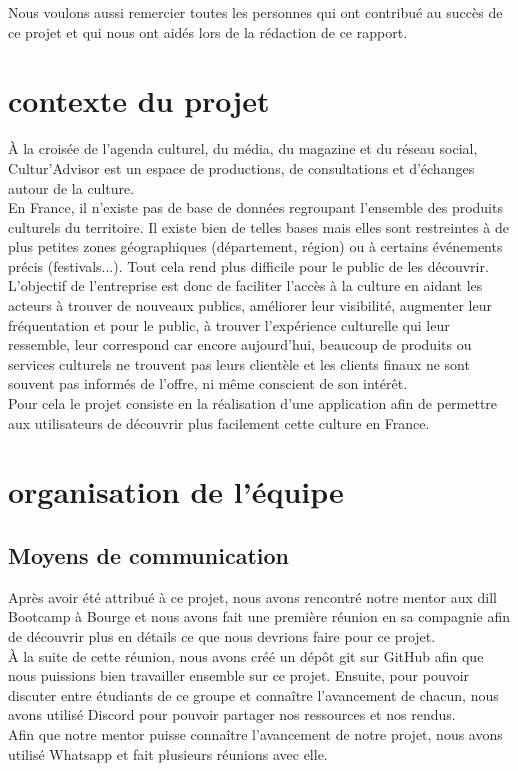 \documentclass{article}
\begin{document}
Nous voulons aussi remercier toutes les personnes qui ont contribué au succès de ce projet et qui nous ont aidés lors de la rédaction de ce rapport.


\newpage
\tableofcontents
\newpage %
\section{contexte du projet}
À la croisée de l’agenda culturel, du média, du magazine et du réseau social, Cultur’Advisor est un espace de productions, de consultations et d’échanges autour de la culture.\\
En France, il n’existe pas de base de données regroupant l’ensemble des produits culturels du territoire. Il existe bien de telles bases mais elles sont restreintes à de plus petites zones géographiques (département, région) ou à certains événements précis (festivals...). Tout cela rend plus difficile pour le public de les découvrir.\\
L’objectif de l’entreprise est donc de faciliter l’accès à la culture en aidant les acteurs à trouver de nouveaux publics, améliorer leur visibilité, augmenter leur fréquentation et pour le public, à trouver l’expérience culturelle qui leur ressemble, leur correspond car encore aujourd’hui, beaucoup de produits ou services culturels ne trouvent pas leurs clientèle et les clients finaux ne sont souvent pas informés de l’offre, ni même conscient de son intérêt.\\
Pour cela le projet consiste en la réalisation d’une application afin de permettre aux utilisateurs de découvrir plus facilement cette culture en France.
\newpage

\section{organisation de l'équipe}

\subsection{Moyens de communication}
Après avoir été attribué à ce projet, nous avons rencontré notre mentor aux dill Bootcamp à Bourge et nous avons fait une première réunion en sa compagnie afin de découvrir plus en détails ce que nous devrions faire pour ce projet. \\
À la suite de cette réunion, nous avons créé un dépôt git sur GitHub afin que nous puissions bien travailler ensemble sur ce projet. Ensuite, pour pouvoir discuter entre étudiants de ce groupe et connaître l’avancement de chacun, nous avons utilisé Discord pour pouvoir partager nos ressources et nos rendus.\\
Afin que notre mentor puisse connaître l’avancement de notre projet, nous avons utilisé Whatsapp et fait plusieurs réunions avec elle.
\end{document}
